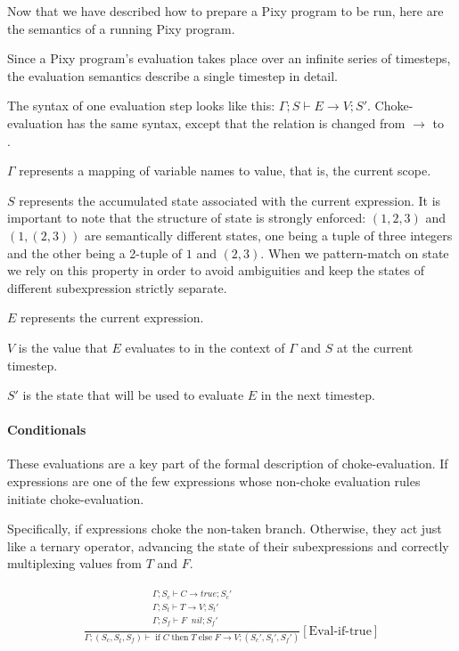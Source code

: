 \documentclass{scrartcl}
\DeclareMathOperator{\ifop}{if}
\DeclareMathOperator{\thenop}{then}
\DeclareMathOperator{\elseop}{else}
\DeclareMathOperator{\ceval}{\overset{C}{\rightarrow}}
\begin{document}
    Now that we have described how to prepare a Pixy program to be run, here are the semantics of a running Pixy program.
    
    Since a Pixy program's evaluation takes place over an infinite series of timesteps, the evaluation semantics describe a single timestep in detail.
    
    The syntax of one evaluation step looks like this: $\Gamma; S \vdash E \rightarrow V; S'$. Choke-evaluation has the same syntax, except that the relation is changed from $\rightarrow$ to $\ceval$.
    
    $\Gamma$ represents a mapping of variable names to value, that is, the current scope.
    
    $S$ represents the accumulated state associated with the current expression. It is important to note that the structure of state is strongly enforced: $(1, 2, 3)$ and $(1,(2, 3))$ are semantically different states, one being a tuple of three integers and the other being a 2-tuple of $1$ and $(2,3)$. When we pattern-match on state we rely on this property in order to avoid ambiguities and keep the states of different subexpression strictly separate.
    
    $E$ represents the current expression.
    
    $V$ is the value that $E$ evaluates to in the context of $\Gamma$ and $S$ at the current timestep.
    
    $S'$ is the state that will be used to evaluate $E$ in the next timestep.
    
    \paragraph{Conditionals}
    
    These evaluations are a key part of the formal description of choke-evaluation. If expressions are one of the few expressions whose non-choke evaluation rules initiate choke-evaluation.
    
    Specifically, if expressions choke the non-taken branch. Otherwise, they act just like a ternary operator, advancing the state of their subexpressions and correctly multiplexing values from $T$ and $F$.
    
    \begin{align*}
    \frac{
        \begin{matrix}
        \Gamma; S_c \vdash C \rightarrow true; S_c' \\
        \Gamma; S_t \vdash T \rightarrow V; S_t' \\
        \Gamma; S_f \vdash F \ceval nil; S_f' \\
        \end{matrix}
    }{
        \Gamma; (S_c, S_t, S_f) \vdash \ifop C \thenop T \elseop F \rightarrow V; (S_c', S_t', S_f')
    }[\text{Eval-if-true}]
    \end{align*}
    
\end{document}
